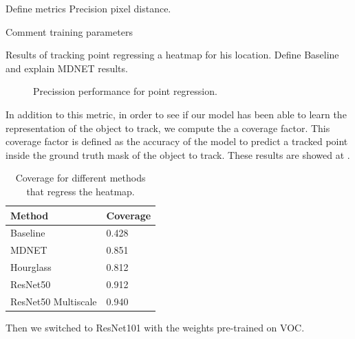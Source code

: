 


Define metrics Precision pixel distance.

Comment training parameters

Results of tracking point regressing a heatmap for his location. Define Baseline and explain MDNET results.

\begin{figure}[h]
	\centering
	
  \label{fig:tracking_point_regression}
	\caption{Precission performance for point regression.}
\end{figure}

In addition to this metric, in order to see if our model has been able to learn the representation of the object to track, we compute the a coverage factor.
This coverage factor is defined as the accuracy of the model to predict a tracked point inside the ground truth mask of the object to track.
These results are showed at .

\begin{table}[h]
  \centering
  \begin{tabular}{l|l}
    \toprule
    Method              & Coverage \\
    \midrule
    Baseline            & 0.428    \\
    MDNET               & 0.851    \\
    Hourglass           & 0.812    \\
    ResNet50            & 0.912    \\
    ResNet50 Multiscale & 0.940    \\
    \bottomrule
  \end{tabular}
  \caption{Coverage for different methods that regress the heatmap. }
  \label{tab:coverage_tracking_heatmap}
\end{table}


Then we switched to ResNet101 with the weights pre-trained on VOC.

